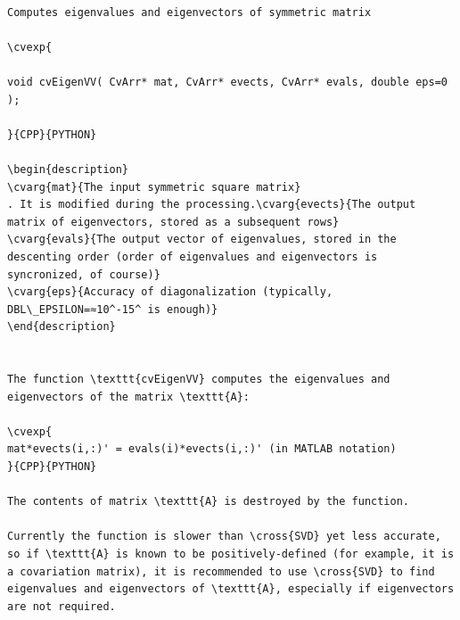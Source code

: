 \label{EigenVV}
\begin{verbatim}

Computes eigenvalues and eigenvectors of symmetric matrix

\cvexp{

void cvEigenVV( CvArr* mat, CvArr* evects, CvArr* evals, double eps=0 );

}{CPP}{PYTHON}

\begin{description}
\cvarg{mat}{The input symmetric square matrix}
. It is modified during the processing.\cvarg{evects}{The output matrix of eigenvectors, stored as a subsequent rows}
\cvarg{evals}{The output vector of eigenvalues, stored in the descenting order (order of eigenvalues and eigenvectors is syncronized, of course)}
\cvarg{eps}{Accuracy of diagonalization (typically, DBL\_EPSILON=≈10^-15^ is enough)}
\end{description}


The function \texttt{cvEigenVV} computes the eigenvalues and eigenvectors of the matrix \texttt{A}:

\cvexp{
mat*evects(i,:)' = evals(i)*evects(i,:)' (in MATLAB notation)
}{CPP}{PYTHON}

The contents of matrix \texttt{A} is destroyed by the function.

Currently the function is slower than \cross{SVD} yet less accurate, so if \texttt{A} is known to be positively-defined (for example, it is a covariation matrix), it is recommended to use \cross{SVD} to find eigenvalues and eigenvectors of \texttt{A}, especially if eigenvectors are not required.


\end{verbatim}
\label{CalcCovarMatrix}
